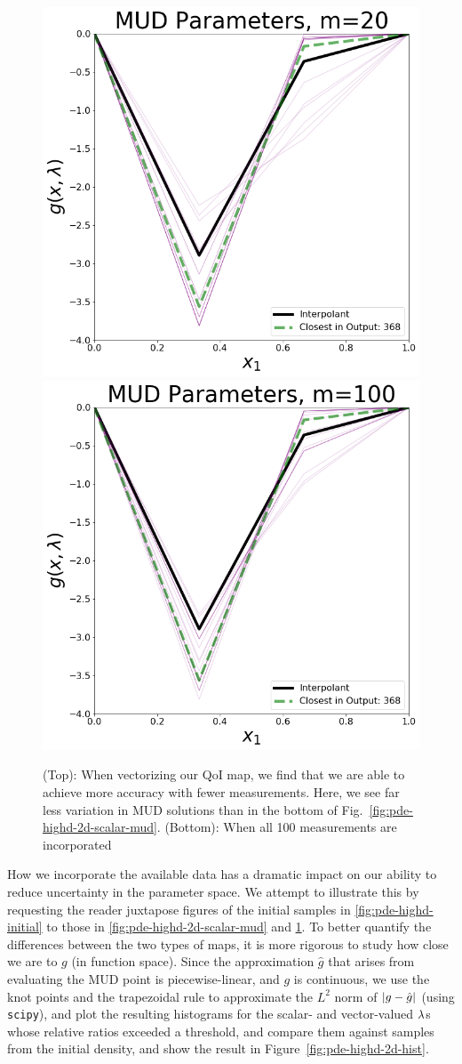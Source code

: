 \begin{figure}[htbp]
\centering
  \includegraphics[width=0.6\linewidth]{figures/pde-highd/pde-highd_pair_D2-2_m20.png}
  \includegraphics[width=0.6\linewidth]{figures/pde-highd/pde-highd_pair_D2-2_m100.png}
\caption{
(Top): When vectorizing our QoI map, we find that we are able to achieve more accuracy with fewer measurements. Here, we see far less variation in MUD solutions than in the bottom of Fig.~\ref{fig:pde-highd-2d-scalar-mud}.
(Bottom): When all 100 measurements are incorporated
}
\label{fig:pde-highd-2d-vector-mud}
\end{figure}

How we incorporate the available data has a dramatic impact on our ability to reduce uncertainty in the parameter space.
We attempt to illustrate this by requesting the reader juxtapose figures of the initial samples in \ref{fig:pde-highd-initial} to those in \ref{fig:pde-highd-2d-scalar-mud} and \ref{fig:pde-highd-2d-vector-mud}.
To better quantify the differences between the two types of maps, it is more rigorous to study how close we are to $g$ (in function space).
Since the approximation $\hat{g}$ that arises from evaluating the MUD point is piecewise-linear, and $g$ is continuous, we use the knot points and the trapezoidal rule to approximate the $L^2$ norm of $\left\vert g - \hat{g}\right\vert$ (using {\tt scipy}), and plot the resulting histograms for the scalar- and vector-valued $\lambda$s whose relative ratios exceeded a threshold, and compare them against samples from the initial density, and show the result in Figure~\ref{fig:pde-highd-2d-hist}.


